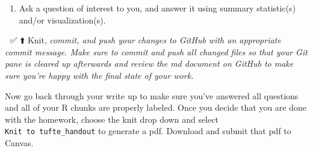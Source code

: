 \documentclass[
]{article}
\providecommand{\tightlist}{%
  \setlength{\itemsep}{0pt}\setlength{\parskip}{0pt}}
\begin{document}
\begin{enumerate}
\def\labelenumi{\arabic{enumi}.}
\setcounter{enumi}{9}
\tightlist
\item
  Ask a question of interest to you, and answer it using summary
  statistic(s) and/or visualization(s).
\end{enumerate}

🧶 ✅ ⬆️ Knit, \emph{commit, and push your changes to GitHub with an
appropriate commit message. Make sure to commit and push all changed
files so that your Git pane is cleared up afterwards and review the md
document on GitHub to make sure you're happy with the final state of
your work.}

Now go back through your write up to make sure you've answered all
questions and all of your R chunks are properly labeled. Once you decide
that you are done with the homework, choose the knit drop down and
select \texttt{Knit\ to\ tufte\_handout} to generate a pdf. Download and
submit that pdf to Canvas.
\end{document}
